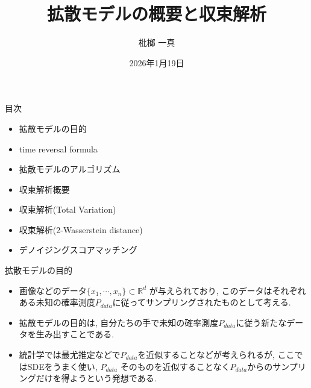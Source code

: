 \documentclass[dvipdfmx,11pt]{beamer}
\title{拡散モデルの概要と収束解析}
\author{枇榔 一真}
\institute{関根$\cdot$ 深澤 $\cdot$ 矢野 研究室}
\date{2026年1月19日}
\theoremstyle{plain}
\theoremstyle{定義}
\begin{document}
\begin{frame}
  \titlepage
\end{frame}
  \begin{frame}{目次}
    \begin{itemize}
      \item 拡散モデルの目的
      \item time reversal formula
      \item 拡散モデルのアルゴリズム
      \item 収束解析概要
      \item 収束解析(Total Variation)
      \item 収束解析(2-Wasserstein distance)
      \item デノイジングスコアマッチング
    \end{itemize}
  \end{frame}
  \begin{frame}{拡散モデルの目的}
    \begin{itemize}
      \item 画像などのデータ$\{x_1,\cdots, x_n\}\subset \mathbb{R}^d$ が与えられており, このデータはそれぞれある未知の確率測度$P_{data}$に従ってサンプリングされたものとして考える.
      \item 拡散モデルの目的は, 自分たちの手で未知の確率測度$P_{data}$に従う新たなデータを生み出すことである.
      \item 統計学では最尤推定などで$P_{data}$を近似することなどが考えられるが, ここではSDEをうまく使い, $P_{data}$ そのものを近似することなく$P_{data}$からのサンプリングだけを得ようという発想である.
    \end{itemize}
  
  \end{frame}
\end{document}
